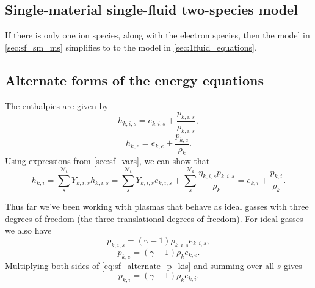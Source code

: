 \documentclass[a4paper,11pt]{report}
\begin{document}
\subsection{Single-material single-fluid two-species model}
If there is only one ion species, along with the electron species, then the model in \cref{sec:sf_sm_ms} simplifies to to the model in \cref{sec:1fluid_equations}.

\subsection{Alternate forms of the energy equations}

The enthalpies are given by
\begin{equation}
    h_{k,i,s} = e_{k,i,s} + \frac{p_{k,i,s}}{\rho_{k,i,s}},
\end{equation}
 \begin{equation}
    \label{eq:sf_alternate_hke_rho}
    h_{k,e} = e_{k,e} + \frac{p_{k,e}}{\rho_k}.
\end{equation}
Using expressions from \cref{sec:sf_vars}, we can show that
\begin{equation}
    \label{eq:sf_alternate_hki_rhok}
    h_{k,i} = \sum_s^{\mathcal{N}_k} Y_{k,i,s} h_{k,i,s} = \sum_s^{\mathcal{N}_k} Y_{k,i,s} e_{k,i,s} + \sum_{s}^{\mathcal{N}_k} \frac{ \eta_{k,i,s} p_{k,i,s}}{\rho_k} = e_{k,i} + \frac{p_{k,i}}{\rho_k}.
\end{equation}

Thus far we've been working with plasmas that behave as ideal gasses with three degrees of freedom (the three translational degrees of freedom). For ideal gasses we also have 
\begin{equation}
    \label{eq:sf_alternate_p_kis}
    p_{k,i,s} = (\gamma - 1) \rho_{k,i,s} e_{k,i,s},
\end{equation}
\begin{equation}
    \label{eq:sf_alternate_p_ke}
    p_{k,e} = (\gamma - 1) \rho_k e_{k,e}.
\end{equation}
Multiplying both sides of \cref{eq:sf_alternate_p_kis} and summing over all $s$ gives
\begin{equation}
    \label{eq:sf_alternate_p_ki}
    p_{k,i} = (\gamma - 1) \rho_k e_{k,i}.
\end{equation}
\end{document}
